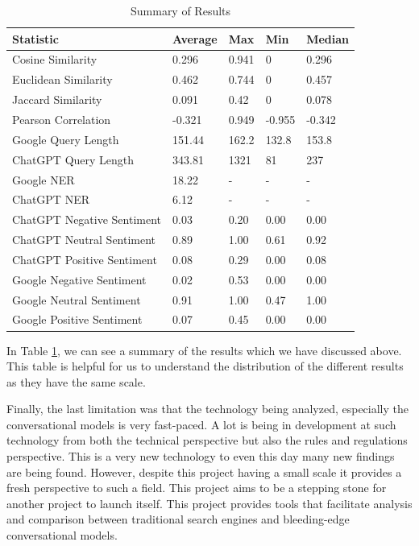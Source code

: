 \documentclass[50pt]{usiinfbachelorproject}
\begin{document}
\begin{table}[H]
  \centering
  \begin{tabular}{|l|l|l|l|l|}
    \hline
    \textbf{Statistic} & \textbf{Average} & \textbf{Max} & \textbf{Min} & \textbf{Median} \\ \hline
    Cosine Similarity & 0.296 & 0.941 & 0 & 0.296 \\ \hline
    Euclidean Similarity & 0.462 & 0.744 & 0 & 0.457 \\ \hline
    Jaccard Similarity & 0.091 & 0.42 & 0 & 0.078 \\ \hline
    Pearson Correlation & -0.321 & 0.949 & -0.955 & -0.342 \\ \hline
    Google Query Length & 151.44 & 162.2 & 132.8 & 153.8 \\ \hline
    ChatGPT Query Length & 343.81 & 1321 & 81 & 237 \\ \hline
    Google NER & 18.22 & - & - & - \\ \hline
    ChatGPT NER & 6.12 & - & - & - \\ \hline
    ChatGPT Negative Sentiment & 0.03 & 0.20 & 0.00 & 0.00 \\ \hline
    ChatGPT Neutral Sentiment & 0.89 & 1.00 & 0.61 & 0.92 \\ \hline
    ChatGPT Positive Sentiment & 0.08 & 0.29 & 0.00 & 0.08 \\ \hline
    Google Negative Sentiment & 0.02 & 0.53 & 0.00 & 0.00 \\ \hline
    Google Neutral Sentiment & 0.91 & 1.00 & 0.47 & 1.00 \\ \hline
    Google Positive Sentiment & 0.07 & 0.45 & 0.00 & 0.00 \\ \hline
  \end{tabular}
  \caption{Summary of Results}
  \label{tab:summary_of_results}
\end{table}

In Table \ref{tab:summary_of_results}, we can see a summary of the results which we have discussed above. This table is helpful for us to understand the distribution of the different results as they have the same scale.


Finally, the last limitation was that the technology being analyzed, especially the conversational models is very fast-paced. A lot is being in development at such technology from both the technical perspective but also the rules and regulations perspective. This is a very new technology to even this day many new findings are being found. However, despite this project having a small scale it provides a fresh perspective to such a field. This project aims to be a stepping stone for another project to launch itself. This project provides tools that facilitate analysis and comparison between traditional search engines and bleeding-edge conversational models. 
\end{document}
